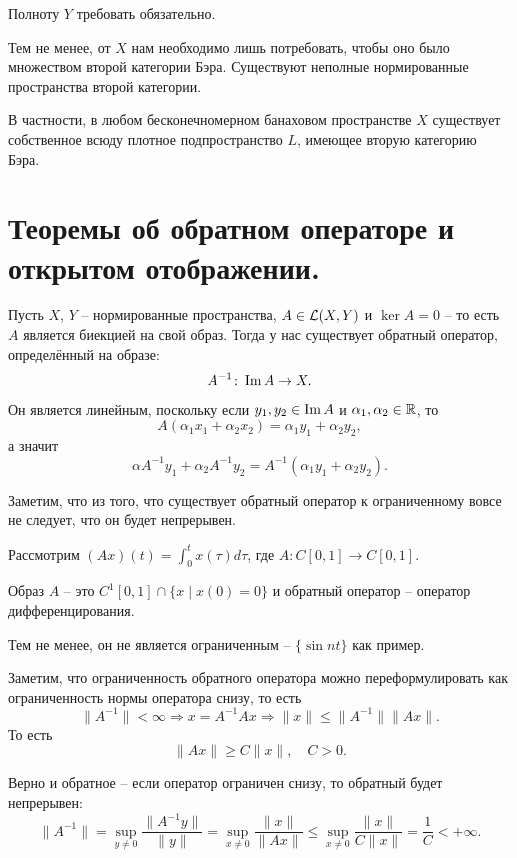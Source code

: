 \begin{note}
    Полноту $Y$ требовать обязательно.

    Тем не менее, от $X$ нам необходимо лишь потребовать, чтобы оно было множеством второй категории Бэра.
    Существуют неполные нормированные пространства второй категории.

    В частности, в любом бесконечномерном банаховом пространстве $X$ существует собственное всюду плотное подпространство $L$, имеющее вторую категорию Бэра.
\end{note}
\section{Теоремы об обратном операторе и открытом отображении.}
\begin{note}
    Пусть $X$, $Y$ -- нормированные пространства, $A \in \mathcal{L}(X, Y)$ и $\ker A = 0$ -- то есть $A$ является биекцией на свой образ.
    Тогда у нас существует обратный оператор, определённый на образе:
    \[
        A^{-1}\colon \operatorname{Im} A \to X.
    \]
    Он является линейным, поскольку если $y_1, y_2 \in \operatorname{Im} A$ и $\alpha_1, \alpha_2 \in \mathbb{R}$, то
    \[
        A(\alpha_1 x_1 + \alpha_2 x_2) = \alpha_1 y_1 + \alpha_2 y_2,
    \]
    а значит
    \[
        \alpha A^{-1}y_1 + \alpha_2 A^{-1}y_2 = A^{-1}(\alpha_1 y_1 + \alpha_2 y_2).
    \]

\end{note}
\begin{note}
    Заметим, что из того, что существует обратный оператор к ограниченному вовсе не следует, что он будет непрерывен.
    \begin{example}
        Рассмотрим $(Ax)(t) = \int_0^t x(\tau)d\tau$, где $A\colon C[0, 1] \to C[0, 1]$.

        Образ $A$ -- это $C^1[0, 1] \cap \{x \mid x(0) = 0\}$ и обратный оператор -- оператор дифференцирования.

        Тем не менее, он не является ограниченным -- $\{\sin nt\}$ как пример.
    \end{example}
\end{note}
\begin{note}
    Заметим, что ограниченность обратного оператора можно переформулировать как ограниченность нормы оператора снизу, то есть
    \[
        \|A^{-1}\| < \infty \Rightarrow x = A^{-1}Ax \Rightarrow \|x\| \leq \|A^{-1}\| \|Ax\|.
    \]
    То есть
    \[
        \|Ax\| \geq C\|x\|, \quad  C > 0.
    \]

    Верно и обратное -- если оператор ограничен снизу, то обратный будет непрерывен:
    \[
        \|A^{-1}\| = \sup_{y \neq 0}\frac{\|A^{-1}y\|}{\|y\|} = \sup_{x \neq 0} \frac{\|x\|}{\|Ax\|} \leq \sup_{x \neq 0} \frac{\|x\|}{C \|x\|} = \frac{1}{C} < +\infty.
    \]
\end{note}
